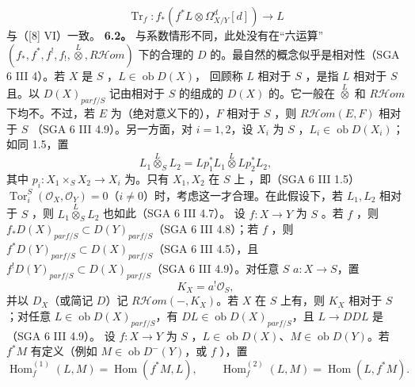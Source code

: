 \[\operatorname{Tr}_f:f_*(f^*L\otimes\Omega^d_{X/Y}[d])\longrightarrow L\tag{6.1.3}\]
与（[8] VI）一致。
\textbf{6.2。} 与系数情形不同，此处没有在“六运算”$(f_*,f^*,f^!,f_!,\mathbin{\overset L\otimes},R\mathcal Hom)$ 下的合理的 $D$ 的。最自然的概念似乎是相对性（SGA 6 III 4）。若 $X$ 是 $S$ ，$L\in\operatorname{ob}D(X)$，
回顾称 $L$ 相对于 $S$ ，是指 $L$ 相对于 $S$ 且。以 $D(X)_{parf/S}$ 记由相对于 $S$ 的组成的 $D(X)$ 的。它一般在 $\mathbin{\overset L\otimes}$ 和 $R\mathcal Hom$ 下均不。不过，若 $E$ 为（绝对意义下的），$F$ 相对于 $S$ ，则 $R\mathcal Hom(E,F)$ 相对于 $S$ （SGA 6 III 4.9）。另一方面，对 $i=1,2$，设 $X_i$ 为 $S$ ，$L_i\in\operatorname{ob}D(X_i)$；如同 1.5，置
\[L_1\mathbin{\overset L\otimes}_SL_2=Lp_1^*L_1\mathbin{\overset L\otimes}Lp_2^*L_2,\]
其中 $p_i:X_1\times_SX_2\to X_i$ 为。只有 $X_1,X_2$ 在 $S$ 上 ，即（SGA 6 III 1.5）$\operatorname{Tor}_i^S(\mathcal O_X,\mathcal O_Y)=0$（$i\ne0$）时，考虑这一才合理。在此假设下，若 $L_1,L_2$ 相对于 $S$ ，则 $L_1\mathbin{\overset L\otimes}_SL_2$ 也如此（SGA 6 III 4.7）。
设 $f:X\to Y$ 为 $S$ 。若 $f$ ，则 $f_*D(X)_{parf/S}\subset D(Y)_{parf/S}$（SGA 6 III 4.8）；若 $f$ ，则 $f^*D(Y)_{parf/S}\subset D(X)_{parf/S}$（SGA 6 III 4.5），且 $f^!D(Y)_{parf/S}\subset D(X)_{parf/S}$（SGA 6 III 4.9）。对任意 $S$  $a:X\to S$，置
\[K_X=a^!\mathcal O_S,\tag{6.2.1}\]
并以 $D_X$（或简记 $D$）记 $R\mathcal Hom(-,K_X)$。若 $X$ 在 $S$ 上有，则 $K_X$ 相对于 $S$ ；对任意 $L\in\operatorname{ob}D(X)_{parf/S}$，有 $DL\in\operatorname{ob}D(X)_{parf/S}$，且 $L\to DDL$ 是（SGA 6 III 4.9）。
设 $f:X\to Y$ 为 $S$ ，$L\in\operatorname{ob}D(X)$、$M\in\operatorname{ob}D(Y)$。若 $f^*M$ 有定义（例如 $M\in\operatorname{ob}D^-(Y)$，或 $f$ ），置
\[\operatorname{Hom}_f^{(1)}(L,M)=\operatorname{Hom}(f^*M,L),\qquad\operatorname{Hom}_f^{(2)}(L,M)=\operatorname{Hom}(L,f^*M).\]
